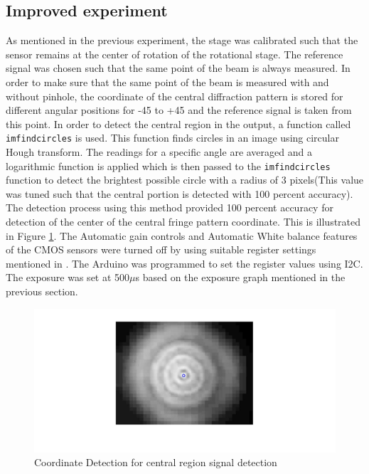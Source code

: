 \subsection{Improved experiment}
As mentioned in the previous experiment, the stage was calibrated such that the sensor remains at the center of rotation of the rotational stage. The reference signal was chosen such that the same point of the beam is always measured. In order to make sure that the same point of the beam is measured with and without pinhole, the coordinate of the central diffraction pattern is stored for different angular positions for -45 to +45 and the reference signal is taken from this point. In order to detect the central region in the output, a function called \texttt{imfindcircles} is used\cite{imfindcircles}. This function finds circles in an image using circular Hough transform. The readings for a specific angle are averaged and a logarithmic function is applied which is then passed to the \texttt{imfindcircles} function to detect the brightest possible circle with a radius of 3 pixels(This value was tuned such that the central portion is detected with 100 percent accuracy). The detection process using this method provided 100 percent accuracy for detection of the center of the central fringe pattern coordinate. This is illustrated in Figure \ref{fig:center_calib}. The Automatic gain controls and Automatic White balance features of the CMOS sensors were turned off by using suitable register settings mentioned in \cite{OV2640DS}. The Arduino was programmed to set the register values using I2C. The exposure was set at 500$\mu$s based on the exposure graph mentioned in the previous section.
\begin{figure}[!h]
\centering
\includegraphics[scale=0.300]{pics/CentralRegionTracking.jpg}
\caption{Coordinate Detection for central region signal detection}
\label{fig:center_calib}
\end{figure}

